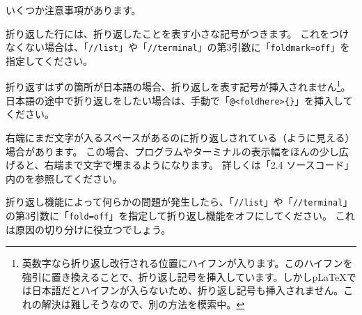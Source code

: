 \begin{starterprogram}\end{starterprogram}
\noindent
{}

\starterresult
{}
\label{}
\begin{starterprogram}\end{starterprogram}
\label{}
\begin{starterterminal}\end{starterterminal}
\endstarterresult

いくつか注意事項があります。

\begin{starteritemize}
\item 折り返した行には、折り返したことを表す小さな記号がつきます。
   これをつけなくない場合は、「\texttt{//list}」や「\texttt{//terminal}」の第3引数に「\texttt{foldmark=off}」を指定してください。
\item 折り返すはずの箇所が日本語の場合、折り返しを表す記号が挿入されません\footnote{英数字なら折り返し改行される位置にハイフンが入ります。このハイフンを強引に置き換えることで、折り返し記号を挿入しています。しかしpLaTeXでは日本語だとハイフンが入らないため、折り返し記号も挿入されません。これの解決は難しそうなので、別の方法を模索中。}。
   日本語の途中で折り返しをしたい場合は、手動で「\texttt{@\textless{}foldhere\textgreater{}\{\}}」を挿入してください。
\item 右端にまだ文字が入るスペースがあるのに折り返しされている（ように見える）場合があります。
   この場合、プログラムやターミナルの表示幅をほんの少し広げると、右端まで文字で埋まるようになります。
   詳しくは「2.4 ソースコード」内のを参照してください。
\item 折り返し機能によって何らかの問題が発生したら、「\texttt{//list}」や「\texttt{//terminal}」の第3引数に「\texttt{fold=off}」を指定して折り返し機能をオフにしてください。
   これは原因の切り分けに役立つでしょう。
\end{starteritemize}

